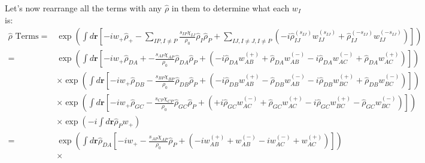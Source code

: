 \documentclass{article}
\begin{document}
  Let's now rearrange all the terms with any $\hat{\rho}$ in them to determine
    what each $w_I$ is:
  \begin{align*}
    \hat{\rho}\textrm{ Terms} =
      &\exp \left(
        \int d \mathbf{r} \left[
          - i w_+ \hat{\rho}_+
          -
          \sum_{IP,I \ne P}
          \frac{s_{IP}\chi_{IJ}}{\rho_0}
          \hat{\rho}_I \hat{\rho}_P
          +
          \sum_{IJ, I \ne J, I \ne P}
          \left(
            -i \hat{\rho}_{IJ}^{(s_{IJ})} w_{IJ}^{(s_{IJ})}
            + \hat{\rho}_{IJ}^{(-s_{IJ})} w_{IJ}^{(-s_{IJ})}
          \right)
        \right]
      \right) \\
    =
      &\exp \left(
        \int d \mathbf{r} \left[
          - i w_+ \hat{\rho}_{DA}
          +
          - \frac{s_{AP}\chi_{AP}}{\rho_0}
          \hat{\rho}_{DA} \hat{\rho}_P
          +
          \left(
            -i \hat{\rho}_{DA} w_{AB}^{(+)} + \hat{\rho}_{DA} w_{AB}^{(-)}
            -i \hat{\rho}_{DA} w_{AC}^{(-)} + \hat{\rho}_{DA} w_{AC}^{(+)}
          \right)
        \right]
      \right) \\
      &\times
      \exp \left(
        \int d \mathbf{r} \left[
          - i w_+ \hat{\rho}_{DB}
          -
          \frac{s_{BP}\chi_{BP}}{\rho_0}
          \hat{\rho}_{DB} \hat{\rho}_P
          +
          \left(
            -i \hat{\rho}_{DB} w_{AB}^{(+)} - \hat{\rho}_{DB} w_{AB}^{(-)}
            -i \hat{\rho}_{DB} w_{BC}^{(+)} + \hat{\rho}_{DB} w_{BC}^{(-)}
          \right)
        \right]
      \right) \\
      &\times
      \exp \left(
        \int d \mathbf{r} \left[
          - i w_+ \hat{\rho}_{GC}
          -
          \frac{s_{CP}\chi_{CP}}{\rho_0}
          \hat{\rho}_{GC} \hat{\rho}_P
          +
          \left(
            +i \hat{\rho}_{GC} w_{AC}^{(-)} + \hat{\rho}_{GC} w_{AC}^{(+)}
            -i \hat{\rho}_{GC} w_{BC}^{(+)} - \hat{\rho}_{GC} w_{BC}^{(-)}
          \right)
        \right]
      \right) \\
              &\times
        \exp\left(
          - i \int d \mathbf{r} \hat{\rho}_{P}  w_+ %
        \right)
  \\
    =
      &\exp \left(
        \int d \mathbf{r} \hat{\rho}_{DA} \left[
          - i w_+ 
          -
          \frac{s_{AP}\chi_{AP}}{\rho_0}
          \hat{\rho}_P
          +
          \left(
            -i w_{AB}^{(+)} + w_{AB}^{(-)}
            -i w_{AC}^{(-)} + w_{AC}^{(+)}
          \right)
        \right]
      \right) \\
      &\times

\end{align*}
\end{document}
